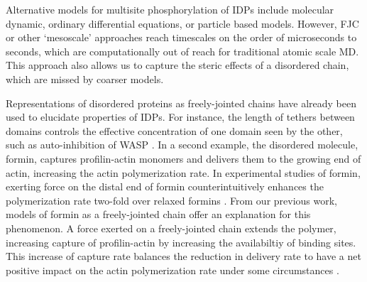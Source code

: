 \documentclass[../AdvancementSummary.tex]{subfiles}
\begin{document}

Alternative models for multisite phosphorylation of IDPs include molecular dynamic, ordinary differential equations, or particle based models. However, FJC or other `mesoscale' approaches reach timescales on the order of microseconds to seconds, which are computationally out of reach for traditional atomic scale MD. This approach also allows us to capture the steric effects of a disordered chain, which are missed by coarser models. 

Representations of disordered proteins as freely-jointed chains have already been used to elucidate properties of IDPs. For instance, the length of tethers between domains controls the effective concentration of one domain seen by the other, such as auto-inhibition of WASP \cite{VanValen2009}. In a second example, the disordered molecule, formin, captures profilin-actin monomers and delivers them to the growing end of actin, increasing the actin polymerization rate. In experimental studies of formin, exerting force on the distal end of formin counterintuitively enhances the polymerization rate two-fold over relaxed formins \cite{Jegou2013}. From our previous work, models of formin as a freely-jointed chain offer an explanation for this phenomenon. A force exerted on a freely-jointed chain extends the polymer, increasing capture of profilin-actin by increasing the availabiltiy of binding sites. This increase of capture rate balances the reduction in delivery rate to have a net positive impact on the actin polymerization rate under some circumstances \cite{Bryant2017}. 


%
%
\end{document}
